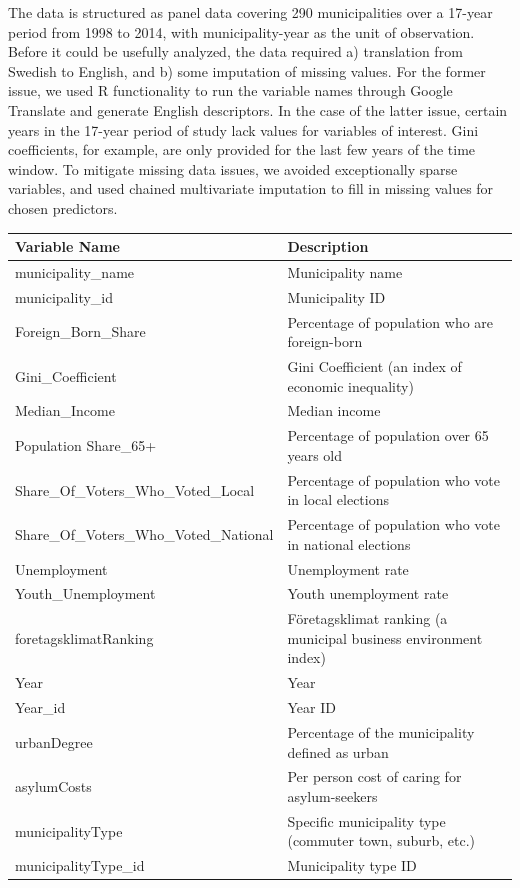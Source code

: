 \documentclass[10pt,a4paper, hidelinks]{article} %
\begin{document}
The data is structured as panel data covering 290 municipalities over a 17-year period from 1998 to 2014, with municipality-year as the unit of observation. Before it could be usefully analyzed, the data required a) translation from Swedish to English, and b) some imputation of missing values. For the former issue, we used R functionality to run the variable names through Google Translate and generate English descriptors. In the case of the latter issue, certain years in the 17-year period of study lack values for variables of interest. Gini coefficients, for example, are only provided for the last few years of the time window. To mitigate missing data issues, we avoided exceptionally sparse variables, and used chained multivariate imputation to fill in missing values for chosen predictors.
%
{\footnotesize
\begin{longtable}{ll}
	\toprule
	Variable Name & Description\\
	\midrule
	municipality\_name & Municipality name \\
	municipality\_id & Municipality ID\\
	Foreign\_Born\_Share & Percentage of population who are foreign-born\\
	Gini\_Coefficient & Gini Coefficient (an index of economic inequality)\\
	Median\_Income & Median income\\
	Population	Share\_65+ & Percentage of population over 65 years old\\
	Share\_Of\_Voters\_Who\_Voted\_Local & Percentage of population who vote in local elections\\
	Share\_Of\_Voters\_Who\_Voted\_National & Percentage of population who vote in national elections\\
	Unemployment & Unemployment rate\\		
	Youth\_Unemployment & Youth unemployment rate\\
	foretagsklimatRanking & F{\"o}retagsklimat ranking (a municipal business environment index)\\
	Year & Year\\
	Year\_id & Year ID\\
	urbanDegree	& Percentage of the municipality defined as urban\\
	asylumCosts	& Per person cost of caring for asylum-seekers\\
	municipalityType & Specific municipality type (commuter town, suburb, etc.)\\
	municipalityType\_id & Municipality type ID\\

\end{longtable}}
\end{document}

